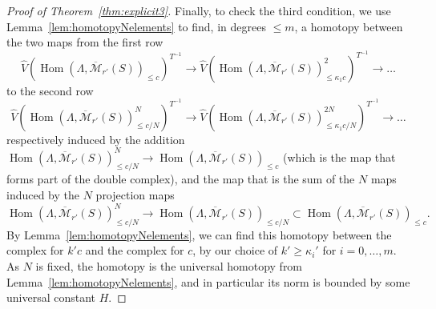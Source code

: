 \documentclass[11pt]{amsbook}
\DeclareMathOperator{\Hom}{Hom}
\numberwithin{equation}{section}
\numberwithin{theorem}{section}
\theoremstyle{definition}
\begin{document}
\begin{proof}[Proof of Theorem~\ref{thm:explicit3}]
Finally, to check the third condition, we use Lemma~\ref{lem:homotopyNelements} to find, in degrees $\leq m$, a homotopy between the two maps from the first row
\[
\widehat{V}(\Hom(\Lambda,\overline{\mathcal M}_{r'}(S))_{\leq c})^{T^{-1}}\to \widehat{V}(\Hom(\Lambda,\overline{\mathcal M}_{r'}(S))_{\leq \kappa_1c}^2)^{T^{-1}}\to \ldots
\]
to the second row
\[
\widehat{V}(\Hom(\Lambda,\overline{\mathcal M}_{r'}(S))_{\leq c/N}^N)^{T^{-1}}\to \widehat{V}(\Hom(\Lambda,\overline{\mathcal M}_{r'}(S))_{\leq \kappa_1c/N}^{2N})^{T^{-1}}\to \ldots
\]
respectively induced by the addition $\Hom(\Lambda,\overline{\mathcal M}_{r'}(S))_{\leq c/N}^N\to \Hom(\Lambda,\overline{\mathcal M}_{r'}(S))_{\leq c}$ (which is the map that forms part of the double complex), and the map that is the sum of the $N$ maps induced by the $N$ projection maps
\[
\Hom(\Lambda,\overline{\mathcal M}_{r'}(S))_{\leq c/N}^N\to \Hom(\Lambda,\overline{\mathcal M}_{r'}(S))_{\leq c/N}\subset \Hom(\Lambda,\overline{\mathcal M}_{r'}(S))_{\leq c}.
\]
By Lemma~\ref{lem:homotopyNelements}, we can find this homotopy between the complex for $k'c$ and the complex for $c$, by our choice of $k'\geq \kappa_i'$ for $i=0,\ldots,m$. As $N$ is fixed, the homotopy is the universal homotopy from Lemma~\ref{lem:homotopyNelements}, and in particular its norm is bounded by some universal constant $H$.


\end{proof}
\end{document}
